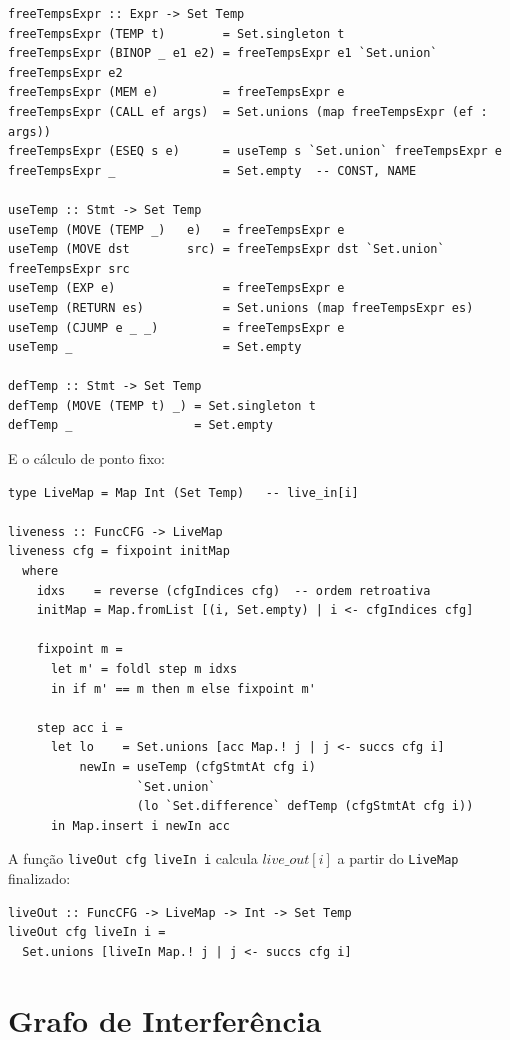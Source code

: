 \begin{verbatim}
freeTempsExpr :: Expr -> Set Temp
freeTempsExpr (TEMP t)        = Set.singleton t
freeTempsExpr (BINOP _ e1 e2) = freeTempsExpr e1 `Set.union` freeTempsExpr e2
freeTempsExpr (MEM e)         = freeTempsExpr e
freeTempsExpr (CALL ef args)  = Set.unions (map freeTempsExpr (ef : args))
freeTempsExpr (ESEQ s e)      = useTemp s `Set.union` freeTempsExpr e
freeTempsExpr _               = Set.empty  -- CONST, NAME

useTemp :: Stmt -> Set Temp
useTemp (MOVE (TEMP _)   e)   = freeTempsExpr e
useTemp (MOVE dst        src) = freeTempsExpr dst `Set.union` freeTempsExpr src
useTemp (EXP e)               = freeTempsExpr e
useTemp (RETURN es)           = Set.unions (map freeTempsExpr es)
useTemp (CJUMP e _ _)         = freeTempsExpr e
useTemp _                     = Set.empty

defTemp :: Stmt -> Set Temp
defTemp (MOVE (TEMP t) _) = Set.singleton t
defTemp _                 = Set.empty
\end{verbatim}

E o cálculo de ponto fixo:

\begin{verbatim}
type LiveMap = Map Int (Set Temp)   -- live_in[i]

liveness :: FuncCFG -> LiveMap
liveness cfg = fixpoint initMap
  where
    idxs    = reverse (cfgIndices cfg)  -- ordem retroativa
    initMap = Map.fromList [(i, Set.empty) | i <- cfgIndices cfg]

    fixpoint m =
      let m' = foldl step m idxs
      in if m' == m then m else fixpoint m'

    step acc i =
      let lo    = Set.unions [acc Map.! j | j <- succs cfg i]
          newIn = useTemp (cfgStmtAt cfg i)
                  `Set.union`
                  (lo `Set.difference` defTemp (cfgStmtAt cfg i))
      in Map.insert i newIn acc
\end{verbatim}

A função \texttt{liveOut cfg liveIn i} calcula $\mathit{live\_out}[i]$
a partir do \texttt{LiveMap} finalizado:

\begin{verbatim}
liveOut :: FuncCFG -> LiveMap -> Int -> Set Temp
liveOut cfg liveIn i =
  Set.unions [liveIn Map.! j | j <- succs cfg i]
\end{verbatim}

\section{Grafo de Interferência}

